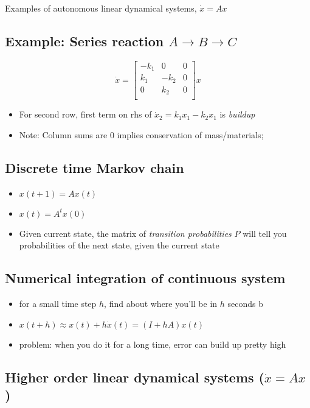 \documentclass[10pt,letterpaper]{article}
\begin{document}
Examples of autonomous linear dynamical systems, $\dot x = Ax$ 
\subsection{Example: Series reaction $A \rightarrow B \rightarrow C$}
\label{sec-8_1}

$$
\dot x=
\begin{bmatrix}
  -k_1 & 0    & 0 \\
  k_1  & -k_2 & 0 \\
  0    & k_2  & 0 \\
\end{bmatrix}
x
$$
\begin{itemize}
\item For second row, first term on rhs of $\dot x_2 = k_1 x_1 - k_2 x_1$ is \emph{buildup}
\item Note: Column sums are 0 implies conservation of mass/materials;
\end{itemize}
\subsection{Discrete time Markov chain}
\label{sec-8_2}

\begin{itemize}
\item $x(t+1) = Ax(t)$
\item $x(t) = A ^{t} x(0)$
\item Given current state, the matrix of \emph{transition probabilities} $P$ will tell you probabilities of the next state, given the current state
\end{itemize}
\subsection{Numerical integration of continuous system}
\label{sec-8_3}

\begin{itemize}
\item for a small time step $h$, find about where you'll be in $h$ seconds b
\item $x(t+h) \approx x(t) + h \dot x(t) = (I + hA) x(t)$
\item problem: when you do it for a long time, error can build up pretty high
\end{itemize}
\subsection{Higher order linear dynamical systems ($\dot x=Ax$)}
\label{sec-8_4}
\end{document}
